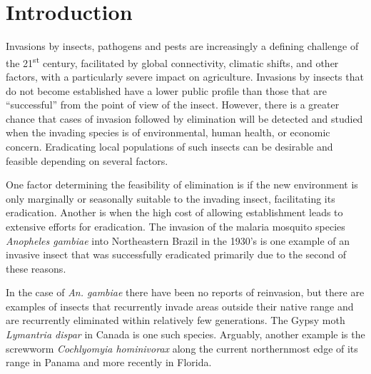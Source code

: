 \documentclass[10pt,a4paper,twocolumn]{article}
\begin{document}
\clearpage


\section*{Introduction}

Invasions by insects, pathogens and pests are increasingly a 
defining challenge of the 21\textsuperscript{st} century, 
facilitated by global connectivity, climatic shifts, and
other factors\cite{simberloff_impacts_2013,Pimentel2007}, with a particularly 
severe impact on agriculture\cite{paini2016global}.
Invasions by insects that do not become established have a lower public profile
than those that are ``successful'' from the point of view of the insect.
However, there is a greater chance that cases of invasion followed by elimination
will be detected and studied 
when the invading species is of environmental, human health, or 
economic concern\cite{liebhold_population_2008}.
Eradicating local populations of such insects can be desirable and 
feasible\cite{myers_eradication_2000} depending on several factors.

One factor determining the feasibility of elimination
is if the new environment is only marginally or 
seasonally suitable to the invading insect, facilitating its eradication.
Another is when the high cost of allowing establishment leads
to extensive efforts for eradication.
The invasion of the malaria mosquito species \textit{Anopheles gambiae}
into Northeastern Brazil in the 1930's\cite{soper_emphanopheles_1943}
is one example of an invasive insect that was successfully eradicated 
primarily due to the second of these
reasons\cite{causey_ecology_1943,killeen_eradication_2002}.

In the case of \textit{An. gambiae} there have been no reports of
reinvasion, but there are examples of insects that
recurrently invade areas outside their native range and are recurrently
eliminated within relatively few generations.
The Gypsy moth \textit{Lymantria dispar} in Canada\cite{gray_hitchhikers_2010} 
is one such species.
Arguably, another example is 
the screwworm \textit{Cochlyomyia hominivorax} along 
the current northernmost edge of its range in 
Panama\cite{robinson_enabling_2009}
and more recently in Florida\cite{matthews2017news}.
\end{document}

